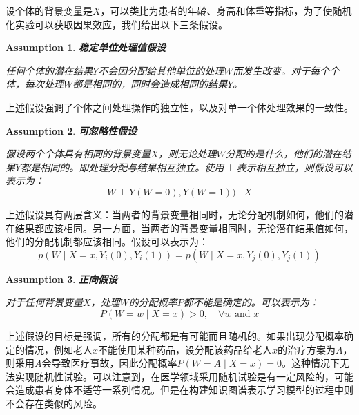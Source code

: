 \documentclass[algorithmlist, AutoFakeBold, AutoFakeSlant, figurelist, tablelist, nomlist, masters]{seuthesix}
\begin{document}
设个体的背景变量是$X$，可以类比为患者的年龄、身高和体重等指标，为了使随机化实验可以获取因果效应，我们给出以下三条假设。
\newtheorem{assumption}{Assumption}[section]
\begin{assumption}
  \textbf{稳定单位处理值假设}

  任何个体的潜在结果$Y$不会因分配给其他单位的处理$W$而发生改变。对于每个个体，每次处理$W$都是相同的，同时会造成相同的结果$Y$。
\end{assumption}
上述假设强调了个体之间处理操作的独立性，以及对单一个体处理效果的一致性。

\begin{assumption}
  \textbf{可忽略性假设}

  假设两个个体具有相同的背景变量$X$，则无论处理$W$分配的是什么，他们的潜在结果$Y$都是相同的。即处理分配与结果相互独立。使用$\perp$表示相互独立，则假设可以表示为：
  \begin{equation}
    W \perp Y(W=0), Y(W=1)) \mid X
  \end{equation}
\end{assumption}
上述假设具有两层含义：当两者的背景变量相同时，无论分配机制如何，他们的潜在结果都应该相同。另一方面，当两者的背景变量相同时，无论潜在结果值如何，他们的分配机制都应该相同。假设可以表示为：
\begin{equation}
  p\left(W \mid X=x, Y_i(0), Y_i(1)\right)=p\left(W \mid X=x, Y_j(0), Y_j(1)\right)
\end{equation}

\begin{assumption}
  \textbf{正向假设}

  对于任何背景变量$X$，处理$W$的分配概率$P$都不能是确定的。可以表示为：
  \begin{equation}
    P(W=w \mid X=x)>0, \quad \forall w \text { and } x
  \end{equation}
\end{assumption}
上述假设的目标是强调，所有的分配都是有可能而且随机的。如果出现分配概率确定的情况，例如老人$x$不能使用某种药品，设分配该药品给老人$x$的治疗方案为$A$，则采用$A$会导致医疗事故，因此分配概率$P(W=A \mid X=x) = 0$。这种情况下无法实现随机性试验。可以注意到，在医学领域采用随机试验是有一定风险的，可能会造成患者身体不适等一系列情况。但是在构建知识图谱表示学习模型的过程中则不会存在类似的风险。
\end{document}
